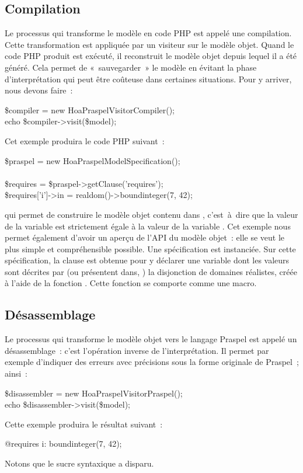 \subsection{Compilation}
\label{subsection:tools:compilation}

Le processus qui transforme le modèle en code PHP est appelé une compilation.
Cette transformation est appliquée par un visiteur sur le modèle objet. Quand
le code PHP produit est exécuté, il reconstruit le modèle objet depuis lequel il
a été généré. Cela permet de «~sauvegarder~» le modèle en évitant la phase
d'interprétation qui peut être coûteuse dans certaines situations. Pour y
arriver, nous devons faire~:
%
\begin{pre}
\$compiler = new Hoa\bslash{}Praspel\bslash{}Visitor\bslash{}Compiler(); \\
echo \$compiler->visit(\$model);
\end{pre}
%
Cet exemple produira le code PHP suivant~:
%
\begin{pre}
\$praspel = new \bslash{}Hoa\bslash{}Praspel\bslash{}Model\bslash{}Specification(); \\
 \\
\$requires = \$praspel->getClause('requires'); \\
\$requires['i']->in = realdom()->boundinteger(7, 42);
\end{pre}
%
qui permet de construire le modèle objet contenu dans ,
c'est~à~dire que la valeur de la variable  est strictement égale à
la valeur de la variable . Cet exemple nous permet également
d'avoir un aperçu de l'API du modèle objet~: elle se veut le plus simple et
compréhensible possible. Une spécification est instanciée. Sur cette
spécification, la clause \arequires est obtenue pour y déclarer une variable
 dont les valeurs sont décrites par (ou présentent dans, ) la
disjonction de domaines réalistes, créée à l'aide de la fonction .
Cette fonction se comporte comme une macro.

\subsection{Désassemblage}
\label{subsection:tools:disassembler}

Le processus qui transforme le modèle objet vers le langage Praspel est appelé
un désassemblage~: c'est l'opération inverse de l'interprétation. Il permet par
exemple d'indiquer des erreurs avec précisions sous la forme originale de
Praspel~; ainsi~:
%
\begin{pre}
\$disassembler = new Hoa\bslash{}Praspel\bslash{}Visitor\bslash{}Praspel(); \\
echo \$disassembler->visit(\$model);
\end{pre}
Cette exemple produira le résultat suivant~:
%
\begin{pre}
@requires i: boundinteger(7, 42);
\end{pre}
%
Notons que le sucre syntaxique  a disparu.

